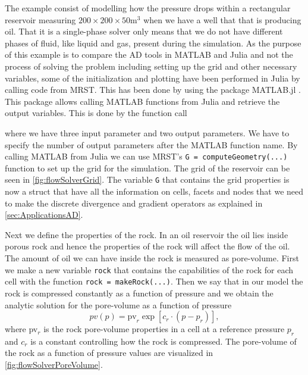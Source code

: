 The example consist of modelling how the pressure drops within a rectangular reservoir measuring $200\times 200 \times 50 \text{m}^3$ when we have a well that that is producing oil. That it is a single-phase solver only means that we do not have different phases of fluid, like liquid and gas, present during the simulation. As the purpose of this example is to compare the AD tools in MATLAB and Julia and not the process of solving the problem including setting up the grid and other necessary variables, some of the initialization and plotting have been performed in Julia by calling code from MRST. This has been done by using the package MATLAB.jl \emph{\citep{MATLAB.jl}}. This package allows calling MATLAB functions from Julia and retrieve the output variables. This is done by the function call

where we have three input parameter and two output parameters. We have to specify the number of output parameters after the MATLAB function name.  By calling MATLAB from Julia we can use MRST's \texttt{G = computeGeometry(...)} function to set up the grid for the simulation. The grid of the reservoir can be seen in \autoref{fig:flowSolverGrid}. The variable \texttt{G} that contains the grid properties is now a struct that have all the information on cells, facets and nodes that we need to make the discrete divergence and gradient operators as explained in \autoref{sec:ApplicationsAD}. 

Next we define the properties of the rock. In an oil reservoir the oil lies inside porous rock and hence the properties of the rock will affect the flow of the oil. The amount of oil we can have inside the rock is measured as pore-volume. First we make a new variable \texttt{rock} that contains the capabilities of the rock for each cell with the function  \texttt{rock = makeRock(...)}. Then we say that in our model the rock is compressed constantly as a function of pressure and we obtain the analytic solution for the pore-volume as a function of pressure
\begin{equation*}
    pv(p) = \text{pv}_r \exp[c_r\cdot(p-p_r)],
\end{equation*}
where pv$_r$ is the rock pore-volume properties in a cell at a reference pressure $p_r$ and $c_r$ is a constant controlling how the rock is compressed. The pore-volume of the rock as a function of pressure values are visualized in \autoref{fig:flowSolverPoreVolume}. 

